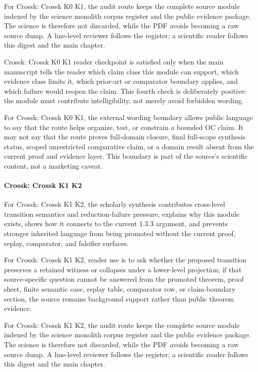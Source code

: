 For Crossk: Crossk K0 K1, the audit route keeps the complete source module indexed by the science monolith corpus register and the public evidence package. The science is therefore not discarded, while the PDF avoids becoming a raw source dump. A line-level reviewer follows the register; a scientific reader follows this digest and the main chapter.


Crossk: Crossk K0 K1 reader checkpoint is satisfied only when the main manuscript tells the reader which claim class this module can support, which evidence class limits it, which prior-art or comparator boundary applies, and which failure would reopen the claim. This fourth check is deliberately positive: the module must contribute intelligibility, not merely avoid forbidden wording.


For Crossk: Crossk K0 K1, the external wording boundary allows public language to say that the route helps organize, test, or constrain a bounded OC claim. It may not say that the route proves full-domain closure, final full-scope synthesis status, scoped unrestricted comparative claim, or a domain result absent from the current proof and evidence layer. This boundary is part of the source's scientific content, not a marketing caveat.


\paragraph{Crossk: Crossk K1 K2}

For Crossk: Crossk K1 K2, the scholarly synthesis contributes cross-level transition semantics and reduction-failure pressure, explains why this module exists, shows how it connects to the current 1.3.3 argument, and prevents stronger inherited language from being promoted without the current proof, replay, comparator, and falsifier surfaces.


For Crossk: Crossk K1 K2, reader use is to ask whether the proposed transition preserves a retained witness or collapses under a lower-level projection; if that source-specific question cannot be answered from the promoted theorem, proof sheet, finite semantic case, replay table, comparator row, or claim-boundary section, the source remains background support rather than public theorem evidence.


For Crossk: Crossk K1 K2, the audit route keeps the complete source module indexed by the science monolith corpus register and the public evidence package. The science is therefore not discarded, while the PDF avoids becoming a raw source dump. A line-level reviewer follows the register; a scientific reader follows this digest and the main chapter.


